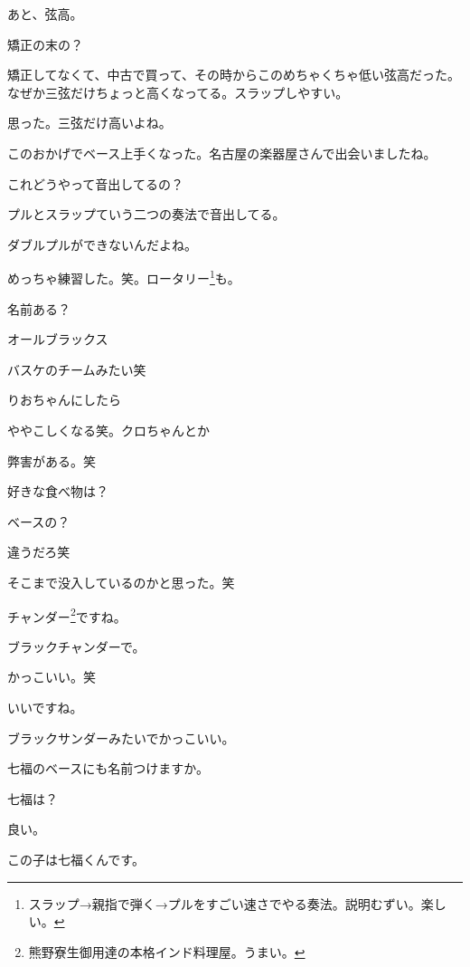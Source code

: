 \begin{multicols}{3}
あと、弦高。

矯正の末の？

矯正してなくて、中古で買って、その時からこのめちゃくちゃ低い弦高だった。なぜか三弦だけちょっと高くなってる。スラップしやすい。

思った。三弦だけ高いよね。

このおかげでベース上手くなった。名古屋の楽器屋さんで出会いましたね。

これどうやって音出してるの？

プルとスラップていう二つの奏法で音出してる。

ダブルプルができないんだよね。

めっちゃ練習した。笑。ロータリー\footnote{スラップ→親指で弾く→プルをすごい速さでやる奏法。説明むずい。楽しい。}も。

名前ある？

オールブラックス

バスケのチームみたい笑

りおちゃんにしたら

ややこしくなる笑。クロちゃんとか

弊害がある。笑

好きな食べ物は？

ベースの？

違うだろ笑

そこまで没入しているのかと思った。笑

チャンダー\footnote{熊野寮生御用達の本格インド料理屋。うまい。}ですね。

ブラックチャンダーで。

かっこいい。笑

いいですね。

ブラックサンダーみたいでかっこいい。
 

七福のベースにも名前つけますか。

七福は？

良い。

この子は七福くんです。
 


\end{multicols}
